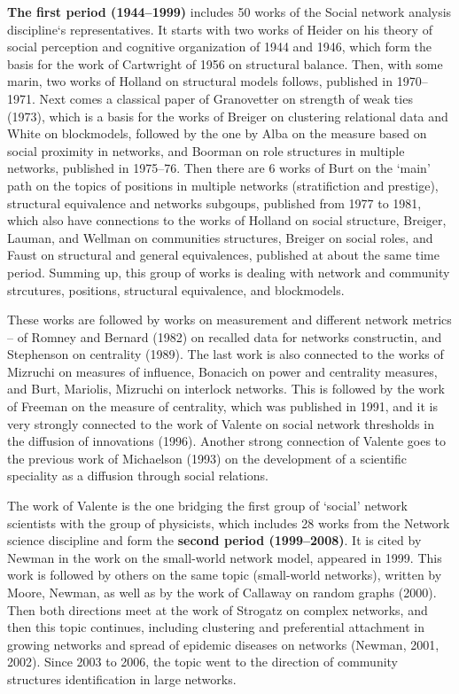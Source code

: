 \documentclass[11pt]{article} %
\begin{document}
\textbf{The first period (1944--1999)} includes 50 works of the Social network analysis discipline`s representatives. It starts with two works of Heider on his theory of social perception and cognitive organization of 1944 and 1946, which form the basis for the work of Cartwright of 1956 on structural balance. Then, with some marin, two works of Holland on structural models follows, published in 1970--1971. Next comes a classical paper of Granovetter on strength of weak ties (1973), which is a basis for the works of Breiger on clustering relational data and White on blockmodels, followed by the one by Alba on the measure based on social proximity in networks, and Boorman on role structures in multiple networks, published in 1975--76. Then there are 6 works of Burt on the `main' path on the topics of positions in multiple networks (stratifiction and prestige), structural equivalence and networks subgoups, published from 1977 to 1981, which also have connections to  the works of Holland on social structure, Breiger, Lauman, and Wellman on communities structures, Breiger on social roles, and Faust on structural and general equivalences, published at about the same time period. Summing up, this group of works is dealing with network and community strcutures, positions, structural equivalence, and blockmodels.  \medskip 

These works are followed by works on measurement and different network metrics -- of Romney and Bernard (1982) on recalled data for networks constructin, and Stephenson on centrality (1989). The last work is also connected to the works of Mizruchi on measures of influence, Bonacich on power and centrality measures, and Burt, Mariolis, Mizruchi on interlock networks. This is followed by the work of Freeman on the measure of centrality, which was published in 1991, and it is very strongly connected to the work of Valente on social network thresholds in the diffusion of innovations (1996). Another strong connection of Valente goes to the previous work of Michaelson (1993) on the development of a scientific speciality as a diffusion through social relations.  \medskip 

The work of Valente is the one bridging the first group of `social' network scientists with the group of physicists, which includes 28 works from the Network science discipline and form the \textbf{second period (1999--2008)}. It is cited by Newman in the work on the small-world network model, appeared in 1999. This work is followed by others on the same topic (small-world networks), written by Moore, Newman, as well as by the work of Callaway on random graphs (2000). Then both directions meet at the work of Strogatz on complex networks, and then this topic continues, including 
clustering and preferential attachment in growing networks and spread of epidemic diseases on networks (Newman, 2001, 2002). Since 2003 to 2006, the topic went to the direction of community structures identification in large networks. \medskip 
 
\end{document}
